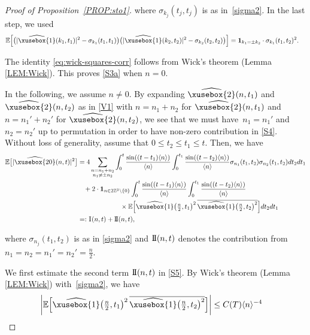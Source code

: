 \documentclass[%
11pt,  reqno]{amsart}
\def\<#1>{\xusebox{#1}}
\newcommand{\1}{\hspace{0.2mm}\text{I}\hspace{0.2mm}}
\newcommand{\II}{\text{I \hspace{-2.8mm} I} }
\newcommand{\noi}{\noindent}
\newcommand{\Z}{\mathbb{Z}}
\newcommand{\E}{\mathbb{E}}
\newcommand{\s}{\sigma}
\newcommand{\ft}{\widehat}
\newcommand{\cj}{\overline}
\newcommand{\jb}[1]
{\langle #1 \rangle}
\newcommand{\ind}{\mathbf 1}
\numberwithin{equation}{section}
\numberwithin{theorem}{section}
\begin{document}
\begin{proof}[Proof of Proposition~\ref{PROP:sto1}]
\noi
where  $\s_{k_j}(t_j,t_j)$ is as in~\eqref{sigma2}. 
In the last step,  we used
\begin{align}
\begin{split}
\E& \Big[\big(  |\ft{\<1>}(k_1, t_1)|^2 -  \s_{k_1}(t_1, t_1)\big)\big( |\ft{\<1>}(k_2, t_2)|^2 -  \s_{k_2}(t_2, t_2)\big)\Big] 
 =  \ind_{k_1=\pm k_2} \cdot  \s_{k_1}(t_1,t_2)^2.
\end{split}
\label{eq:wick-squares-corr}
\end{align}

\noi
The identity \eqref{eq:wick-squares-corr}
follows from Wick's theorem (Lemma \ref{LEM:Wick}).
This proves \eqref{S3a} when $n = 0$.

In the following, we assume $n \ne 0$.
By expanding 
$\ft{\<2>}(n, t_1)$ and $\ft{\<2>}(n, t_2)$
as in  \eqref{V1}
with $n = n_1 + n_2$ 
for $\ft{\<2>}(n, t_1)$
and $n = n_1' + n_2'$ for $\ft{\<2>}(n, t_2)$, 
we see that we must have~$n_1 = n_1'$ and $n_2 = n_2'$ up to permutation
in order to have non-zero contribution in \eqref{S4}.
Without loss of generality, assume that $0 \le t_2 \le t_1 \leq t$.
Then, we have
\begin{align}
\E \big[ |\ft{\<20>}(n, t)|^2\big]
& = 4  \sum_{\substack{n = n_1 + n_2\\n_1 \ne \pm n_2}} \int_0^{t} \frac{\sin((t - t_1) \jb{n})}{\jb{n}} 
 \int_0^{t_1} \frac{\sin((t - t_2) \jb{n})}{\jb{n}} 
\s_{n_1}(t_1, t_2) \s_{n_2}(t_1, t_2)  dt_2dt_1\notag\\
& \hphantom{X}
+ 2 \cdot \ind_{n \in 2 \Z^3\setminus\{0\}} 
 \int_0^t \frac{\sin((t - t_1) \jb{n})}{\jb{n}} 
 \int_0^{t_1} \frac{\sin((t - t_2) \jb{n})}{\jb{n}} 
\notag\\
& \hphantom{XXXXXXX}
\times \E\Big[ \ft{\<1>}\big(\tfrac{n}{2}, t_1\big)^2 \, \cj{\ft{\<1>}\big(\tfrac{n}{2}, t_2\big)^2 } \Big]  dt_2dt_1
\notag\\
& =: 
\1 (n, t)+ \II(n, t), 
\label{S5}
\end{align}

\noi
where $\s_{n_j}(t_1, t_2)$ is as in \eqref{sigma2}
and $\II(n, t)$ denotes the contribution from $n_1 = n_2 = n_1' = n_2' = \frac n2$.



We first estimate the second term $\II(n, t)$ in \eqref{S5}.
By Wick's theorem (Lemma \ref{LEM:Wick}) %
with~\eqref{sigma2}, 
we have
\begin{align*}
 \bigg|\E\Big[ \ft{\<1>}\big(\tfrac{n}{2}, t_1\big)^2 & \, \cj{\ft{\<1>}\big(\tfrac{n}{2}, t_2\big)^2 } \Big] \bigg|
\le C(T) \jb{n}^{-4}
\end{align*}


\end{proof}
\end{document}
